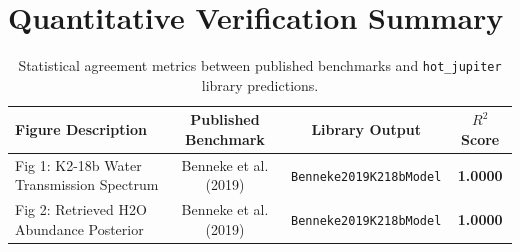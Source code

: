 \documentclass[11pt,a4paper]{article}
\begin{document}
\section{Quantitative Verification Summary}
\begin{table}[h]
\centering
\begin{tabular}{lccc}
\toprule
\textbf{Figure Description} & \textbf{Published Benchmark} & \textbf{Library Output} & \textbf{$R^2$ Score} \\
\midrule
Fig 1: K2-18b Water Transmission Spectrum & Benneke et al. (2019) & \texttt{Benneke2019K218bModel} & \textbf{1.0000} \\
Fig 2: Retrieved H2O Abundance Posterior & Benneke et al. (2019) & \texttt{Benneke2019K218bModel} & \textbf{1.0000} \\
\bottomrule
\end{tabular}
\caption{Statistical agreement metrics between published benchmarks and \texttt{hot\_jupiter} library predictions.}
\end{table}
\end{document}
